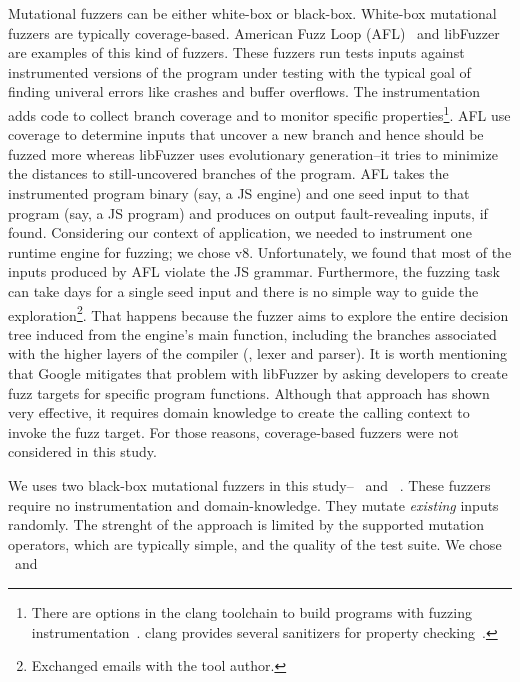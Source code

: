 \documentclass[10pt,conference,anonymous]{IEEEtran}
\begin{document}

Mutational fuzzers can be either white-box or black-box. White-box
mutational fuzzers are typically coverage-based. American Fuzz Loop
(AFL)~\cite{afl} and libFuzzer~\cite{libfuzzer} are examples of this
kind of fuzzers. These fuzzers run tests inputs against instrumented
versions of the program under testing with the typical goal of finding
univeral errors like crashes and buffer overflows. The instrumentation
adds code to collect branch coverage and to monitor specific
properties\footnote{There are options in the clang toolchain to build
  programs with fuzzing instrumentation~\cite{libfuzzer}. clang
  provides several sanitizers for property
  checking~\cite{clang-documentation}.}. AFL use coverage to determine
inputs that uncover a new branch and hence should be fuzzed more
whereas libFuzzer uses evolutionary generation--it tries to minimize
the distances to still-uncovered branches of the program. AFL takes
the instrumented program binary (say, a JS engine) and one seed input
to that program (say, a JS program) and produces on output
fault-revealing inputs, if found. Considering our context of
application, we needed to instrument one runtime engine for fuzzing;
we chose v8. Unfortunately, we found that most of the inputs produced
by AFL violate the JS grammar. Furthermore, the fuzzing task can take
days for a single seed input and there is no simple way to guide the
exploration\footnote{Exchanged emails with the tool author.}. That
happens because the fuzzer aims to explore the entire decision tree
induced from the engine's main function, including the branches
associated with the higher layers of the compiler (\eg{}, lexer and
parser). It is worth mentioning that Google mitigates that problem
with libFuzzer by asking developers to create fuzz targets for
specific program
functions\cite{libFuzzer-tutorial-google,libFuzzer-chromium-google}. Although
that approach has shown very effective, it requires domain knowledge
to create the calling context to invoke the fuzz target. For those
reasons, coverage-based fuzzers were not considered in this study.

We uses two black-box mutational fuzzers in this
study--\radamsa~\cite{radamsa} and \quickfuzz~\cite{quickfuzz}. These
fuzzers require no instrumentation and domain-knowledge. They mutate
\emph{existing} inputs randomly. The strenght of the approach is
limited by the supported mutation operators, which are typically
simple, and the quality of the test suite. We chose \radamsa\ and
\quickfuzz\ 
\end{document}
